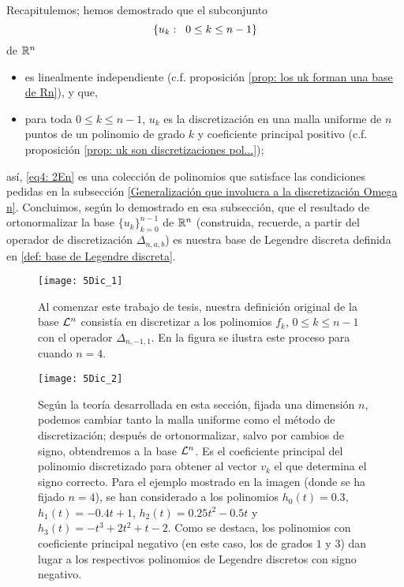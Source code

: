 Recapitulemos; hemos demostrado que 
el subconjunto
\begin{equation}
\label{eq4: 2En}
\{u_{k}: \hspace{0.2cm} 0\leq k \leq n-1 \}
\end{equation}
de $\mathbb{R}^{n}$
\begin{itemize}
\item es linealmente independiente 
(c.f. proposición \ref{prop: los uk forman una base de Rn}), y que,
\item para toda $0\leq k \leq n-1$, $u_{k}$
es la discretización en una malla uniforme
de $n$ puntos de un polinomio de grado $k$
y coeficiente principal positivo
(c.f. proposición \ref{prop: uk son discretizaciones pol...});
\end{itemize}
así, \eqref{eq4: 2En} es una colección de
polinomios que satisface las condiciones pedidas  
en la subsección
\ref{Generalización que involucra a la discretización Omega n}.
Concluimos, según lo demostrado en esa subsección, 
que el resultado de ortonormalizar la 
base $\{u_{k}\}_{k=0}^{n-1}$ de $\mathbb{R}^{n}$
(construida, recuerde, a partir del operador de 
discretización $\Delta_{n, a, b}$)
es nuestra base de Legendre
discreta definida en 
\ref{def: base de Legendre discreta}.

\begin{figure}[H]
\centering\captionsetup{format = hang}
	\begin{measuredfigure}
		\texttt{[image: 5Dic\_1]} 
	\caption{Al comenzar este
	trabajo de tesis,
	nuestra definición original de la base $\mathcal{L}^{n}$
	consistía en discretizar a los polinomios
	$f_{k}$, $0 \leq k \leq n-1$ con el operador $\Delta_{n,-1,1}$.
	En la figura se ilustra este proceso para cuando $n=4$.}
 	\end{measuredfigure}
 \end{figure}
        
     
    
    
\begin{figure}[H]
\centering\captionsetup{format = hang}
	\begin{measuredfigure}
		\texttt{[image: 5Dic\_2]} 
		\caption{Según la teoría
		 desarrollada en esta sección, 
		 fijada una dimensión $n$, podemos
	cambiar tanto la malla uniforme como el método 
	de discretización; después
	de ortonormalizar, salvo por cambios de signo,
	obtendremos a la
	base $\mathcal{L}^{n}$. 
	Es el coeficiente principal del polinomio
	discretizado para obtener al vector $v_{k}$ 
	el que determina
	el signo correcto. Para el ejemplo mostrado
	en la imagen (donde se ha fijado $n=4$), se
	han considerado a los polinomios
	$h_{0}(t)=0.3$, $h_{1}(t)=-0.4t+1$,
	$h_{2}(t)=0.25t^{2}-0.5t$ y $h_{3}(t)=-t^{3}+2t^{2}+t-2$.
	Como se destaca, los polinomios con coeficiente principal
	negativo (en este caso, los de grados $1$ y $3$)
	dan lugar a los respectivos polinomios de Legendre
	discretos con signo negativo.}
 	\end{measuredfigure}
 \end{figure}
